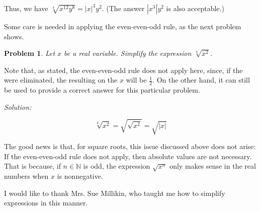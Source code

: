 \documentclass[12pt]{article}
\newtheorem*{prob*}{Problem}
\begin{document}
Thus, we have $\sqrt[4]{x^{12}y^8}=|x|^3y^2$.  (The answer $|x^3|y^2$ is also acceptable.)

Some care is needed in applying the even-even-odd rule, as the next problem shows.

\begin{prob*}
Let $x$ be a real variable.  Simplify the expression $\sqrt[4]{x^2}$.
\end{prob*}

Note that, as stated, the even-even-odd rule does not apply here, since, if the  were eliminated, the resulting  on the $x$ will be $\frac{1}{2}$.  On the other hand, it can still be used to provide a correct answer for this particular problem.

{\sl Solution:\/}

$$\sqrt[4]{x^2}=\sqrt{\sqrt{x^2}}=\sqrt{|x|}$$

The good news is that, for square roots, this issue discussed above does not arise:  If the even-even-odd rule does not apply, then absolute values are not necessary.  That is because, if $n \in \mathbb{N}$ is odd, the expression $\sqrt{x^n}$ only makes sense in the real numbers when $x$ is nonnegative.

I would like to thank Mrs. Sue Millikin, who taught me how to simplify  expressions in this manner.
\end{document}
